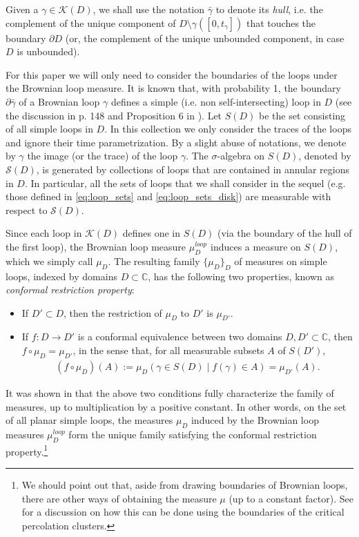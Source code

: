 \documentclass[a4paper, 11pt, reqno]{amsart}
\theoremstyle{definition} \newtheorem{defn}{Definition}[section]
\theoremstyle{remark} \newtheorem{rem}[defn]{Remark}
\theoremstyle{remark} \newtheorem*{rem*}{Remark}
\theoremstyle{plain} \newtheorem{thm}[defn]{Theorem}
\theoremstyle{plain} \newtheorem{lem}[defn]{Lemma}
\theoremstyle{plain} \newtheorem{prop}[defn]{Proposition}
\theoremstyle{plain} \newtheorem{cor}[defn]{Corollary}
\theoremstyle{remark} \newtheorem{exm}[defn]{\textbf{Example}}
\theoremstyle{remark} \newtheorem{exms}[defn]{\textbf{Examples}}
\theoremstyle{remark} \newtheorem*{bl}{}
\numberwithin{equation}{section} %
\newcommand{\mc}{\mathcal}
\newcommand{\C}{\mathbb{C}}
\begin{document}
	Given a $\gamma \in \mc{K}(D)$, we shall use the notation $\bar{\gamma}$ to denote its \textit{hull}, i.e. the complement of the unique component of $D\setminus \gamma([0, t_{\gamma}])$ that touches the boundary $\partial D$  (or, the complement of the unique unbounded component, in case $D$ is unbounded).     
    
    For this paper we will only need to consider the boundaries of the loops under the Brownian loop measure. It is known that, with probability 1, the boundary $\partial \bar{\gamma}$ of a Brownian loop $\gamma$ defines a simple (i.e. non self-intersecting) loop in $D$ (see the discussion in p. 148 and Proposition 6 in \cite{werner08}). Let $S(D)$ be the set consisting of all simple loops in $D$. In this collection we only consider the traces of the loops and ignore their time parametrization. By a slight abuse of notations, we denote by $\gamma$ the image (or the trace) of the loop $\gamma$. The $\sigma$-algebra on $S(D)$, denoted by $\mc{S}(D)$, is generated by collections of loops that are contained in annular regions in $D$. In particular, all the sets of loops that we shall consider in the sequel (e.g. those defined in \eqref{eq:loop_sets} and \eqref{eq:loop_sets_disk}) are measurable with respect to $\mc{S}(D)$. 
    
    Since each loop in $\mc{K}(D)$ defines one in $S(D)$ (via the boundary of the hull of the first loop), the Brownian loop measure $\mu^{loop}_D$ induces a measure on $S(D)$, which we simply call $\mu_D$. The resulting family $\{ \mu_D \}_{D}$ of measures on simple loops, indexed by domains $D \subset \C$, has the following two properties, known as \textit{conformal restriction property}:
    \begin{itemize}
        \item If $D' \subset D$, then the restriction of $\mu_{D}$ to $D'$ is $\mu_{D'}$.

        \item If $f: D \to D'$ is a conformal equivalence between two domains $D, D' \subset \C$, then 
        $f\circ \mu_{D} = \mu_{D'}$, in the sense that,  for all measurable subsets $A$ of $S(D')$,
        \begin{align}\label{eq:conf_inv}
            (f\circ \mu_{D})(A) := \mu_D (\gamma \in S(D) \mid f(\gamma) \in A) = \mu_{D'}(A). 
        \end{align}       
    \end{itemize}
    It was shown in \cite[Theorem 2]{werner08} that the above two conditions fully characterize the family of measures, up to multiplication by a positive constant. In other words, on the set of all planar simple loops, the measures $\mu_D$ induced by the Brownian loop measures $\mu^{loop}_D$ form the unique family satisfying the conformal restriction property.\footnote{We should point out that, aside from drawing boundaries of Brownian loops, there are other ways of obtaining the measure $\mu$ (up to a constant factor). See \cite{werner06} for a discussion on how this can be done using the boundaries of the critical percolation clusters.}
    
\end{document}
